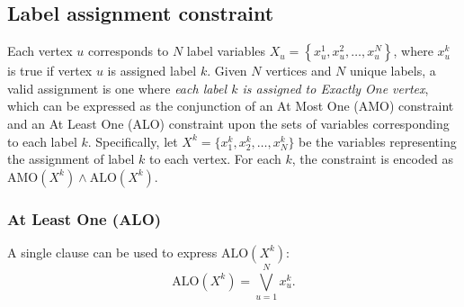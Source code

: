 \documentclass[a4paper,fleqn]{cas-sc}
\begin{document}
    \subsection{Label assignment constraint}
        Each vertex $u$ corresponds to $N$ label variables $X_u=\left\{x_u^1,x_u^2,\dots,x_u^N\right\}$, where $x_u^k$ is true if vertex $u$ is assigned label $k$. Given $N$ vertices and $N$ unique labels, a valid assignment is one where \textit{each label $k$ is assigned to Exactly One vertex}, which can be expressed as the conjunction of an At Most One (AMO) constraint and an At Least One (ALO) constraint upon the sets of variables corresponding to each label $k$. Specifically, let $X^k = \{x_1^k, x_2^k, \dots, x_N^k\}$ be the variables representing the assignment of label $k$ to each vertex. For each $k$, the constraint is encoded as $\text{AMO}(X^k) \wedge \text{ALO}(X^k)$.

        \subsubsection{At Least One (ALO)}
            \noindent A single clause can be used to express $\text{ALO}(X^k)$:
            \begin{equation}
                \text{ALO}(X^k) = \bigvee_{u=1}^{N} x_u^k.
            \end{equation}
\end{document}
